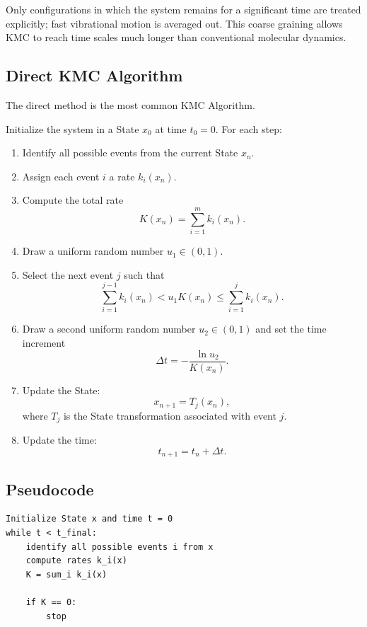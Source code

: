 \documentclass[a4paper, 10pt, onepage]{elegantbook}
\begin{document}
{Only configurations in which the system remains for a significant time are
treated explicitly; fast vibrational motion is averaged out. This coarse
graining allows KMC to reach time scales much longer than conventional molecular
dynamics.

\subsection{Direct KMC Algorithm}

The direct method is the most common KMC Algorithm.

Initialize the system in a State \(x_0\) at time \(t_0=0\). For each step:

\begin{enumerate}
\item Identify all possible events from the current State \(x_n\).

\item Assign each event \(i\) a rate \(k_i(x_n)\).

\item Compute the total rate
\[
K(x_n)=\sum_{i=1}^m k_i(x_n).
\]

\item Draw a uniform random number \(u_1\in(0,1)\).

\item Select the next event \(j\) such that
\[
\sum_{i=1}^{j-1}k_i(x_n)
<
u_1K(x_n)
\le
\sum_{i=1}^{j}k_i(x_n).
\]

\item Draw a second uniform random number \(u_2\in(0,1)\) and set the time
increment
\[
\Delta t
=
-\frac{\ln u_2}{K(x_n)}.
\]

\item Update the State:
\[
x_{n+1}=T_j(x_n),
\]
where \(T_j\) is the State transformation associated with event \(j\).

\item Update the time:
\[
t_{n+1}=t_n+\Delta t.
\]
\end{enumerate}

\subsection{Pseudocode}

\begin{verbatim}
Initialize State x and time t = 0
while t < t_final:
    identify all possible events i from x
    compute rates k_i(x)
    K = sum_i k_i(x)

    if K == 0:
        stop


\end{verbatim}}
\end{document}
